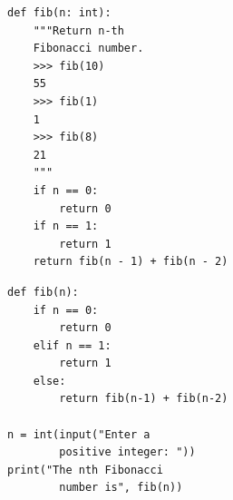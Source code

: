 \begin{tcolorbox}[title={Evol-Instruct-Code-80k-v1 Rephrased Sample}]

\begin{tcolorbox}[title={HumanEval test}, enhanced, colback=white, boxrule=1pt, sharp corners, boxsep=5pt, left=5pt, right=5pt, top=5pt, bottom=5pt]
\fontsize{8pt}{9.6pt}\selectfont
\begin{verbatim}
def fib(n: int):
    """Return n-th 
    Fibonacci number.
    >>> fib(10)
    55
    >>> fib(1)
    1
    >>> fib(8)
    21
    """
    if n == 0:
        return 0
    if n == 1:
        return 1
    return fib(n - 1) + fib(n - 2)
\end{verbatim}
\end{tcolorbox}


\begin{tcolorbox}[title={Evol-Instruct-Code-80k-v1}, enhanced, colback=white, boxrule=1pt, sharp corners, boxsep=5pt, left=5pt, right=5pt, top=5pt, bottom=5pt]
\fontsize{8pt}{9.6pt}\selectfont
\begin{verbatim}
def fib(n):
    if n == 0:
        return 0
    elif n == 1:
        return 1
    else:
        return fib(n-1) + fib(n-2)

n = int(input("Enter a 
        positive integer: "))
print("The nth Fibonacci 
        number is", fib(n))
\end{verbatim}
\end{tcolorbox}

\end{tcolorbox}


